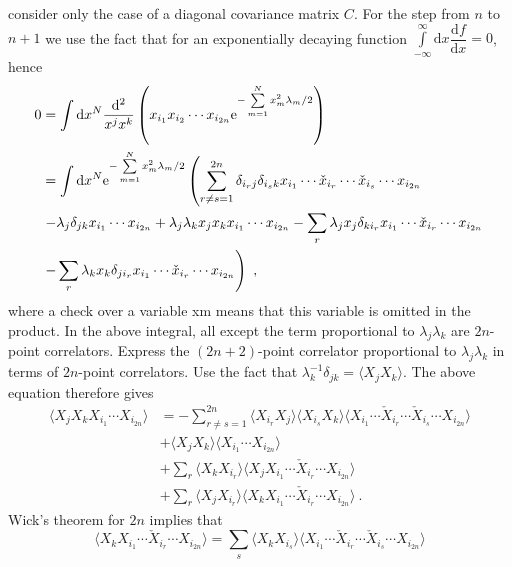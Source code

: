 \documentclass[12pt,a4paper]{article}
\newcommand{\dif}{\mathrm{d}}
\begin{document}
consider only the case of a diagonal covariance matrix $C$. For the step from $n$ to $n + 1$ we use the fact that for an exponentially decaying function $\int\limits_{-\infty}^\infty \dif x \dfrac{\dif f}{\dif x} = 0$, hence
\begin{align}
\nonumber 0 &= \int \dif x^N \dfrac{\dif^2}{x^j x^k} \left(x_{i_1} x_{i_2} \cdots x_{i_{2n}} {\rm e}^{-\sum\limits_{m=1}^N x_m^2 \lambda_m /2} \right) \\
\nonumber &= \int \dif x^N {\rm e}^{-\sum\limits_{m=1}^N x_m^2 \lambda_m /2} \left(\sum_{r\neq s = 1}^{2n} \delta_{i_rj} \delta_{i_s k} x_{i_1} \cdots \check{x}_{i_r} \cdots \check{x}_{i_s} \cdots x_{i_{2n}} \right. \\
\nonumber & \left. - \lambda_j \delta_{jk} x_{i_1} \cdots x_{i_{2n}} +\lambda_j \lambda_k x_j x_k x_{i_1} \cdots x_{i_{2n}} - \sum_r \lambda_j x_j \delta_{k i_r} x_{i_1} \cdots \check{x}_{i_r} \cdots x_{i_{2n}} \right. \\
& \left. -\sum_r \lambda_k x_k \delta_{ji_r} x_{i_1} \cdots   \check{x}_{i_r} \cdots x_{i_{2n}} \right) ~,
\end{align}
where a check over a variable xm means that this variable is omitted in the product. In the above integral, all except the term proportional to $\lambda_j \lambda_k$ are $2n$-point correlators. Express the $(2n + 2)$-point correlator proportional to $\lambda_j \lambda_k$ in terms of $2n$-point correlators. Use the fact that $\lambda_k^{-1} \delta_{jk} = \langle X_j X_k \rangle$. The above equation therefore gives
\begin{align}
\nonumber \langle X_j X_k X_{i_1} \cdots X_{i_{2n}} \rangle  &= -\sum_{r\neq s=1}^{2n} \langle X_{i_r} X_{j} \rangle \langle X_{i_s} X_{k} \rangle \langle X_{i_1} \cdots \check{X}_{i_r} \cdots \check{X}_{i_s} \cdots X_{i_{2n}} \rangle \\
\nonumber & + \langle X_{j} X_{k} \rangle \langle X_{i_1} \cdots X_{i_{2n}} \rangle \\
\nonumber & + \sum_r \langle X_k X_{i_r} \rangle \langle X_{j} X_{i_1} \cdots \check{X}_{i_r} \cdots X_{i_{2n}} \rangle \\
\nonumber &+ \sum_r \langle X_j X_{i_r} \rangle \langle X_{k} X_{i_1} \cdots \check{X}_{i_r} \cdots X_{i_{2n}} \rangle ~.
\end{align}
Wick's theorem for $2n$ implies that
\begin{equation}
\langle X_k X_{i_1} \cdots \check{X}_{i_r} \cdots X_{i_{2n}} \rangle = \sum_s  \langle X_k X_{i_s} \rangle \langle X_{i_1} \cdots \check{X}_{i_r} \cdots \check{X}_{i_s} \cdots X_{i_{2n}} \rangle
\end{equation}
\end{document}

